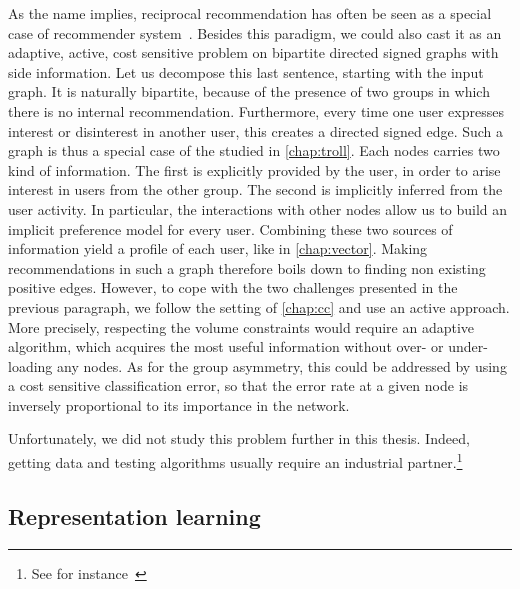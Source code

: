 As the name implies, reciprocal recommendation has often be seen as a special case of recommender
system~\autocite{Andrews2015}. Besides this paradigm, we could also cast it as an adaptive, active,
cost sensitive \esp{} problem on bipartite directed signed graphs with side information. Let us
decompose this last sentence, starting with the input graph. It is naturally bipartite, because of
the presence of two groups in which there is no internal recommendation. Furthermore, every time one
user expresses interest or disinterest in another user, this creates a directed signed edge. Such a
graph is thus a special case of the \dssn{} studied in \autoref{chap:troll}. Each nodes carries two
kind of information. The first is explicitly provided by the user, in order to arise interest in
users from the other group. The second is implicitly inferred from the user activity. In particular,
the interactions with other nodes allow us to build an implicit preference model for every user.
Combining these two sources of information yield a profile of each user, like in
\autoref{chap:vector}. Making recommendations in such a graph therefore boils down to finding non
existing positive edges. However, to cope with the two challenges presented in the previous
paragraph, we follow the setting of \autoref{chap:cc} and use an active approach. More precisely,
respecting the volume constraints would require an adaptive algorithm, which acquires the most
useful information without over- or under-loading any nodes. As for the group asymmetry, this could
be addressed by using a cost sensitive classification error, so that the error rate at a given node
is inversely proportional to its importance in the network.

Unfortunately, we did not study this problem further in this thesis. Indeed, getting data and
testing algorithms usually require an industrial partner.\footnote{See for
instance~\autocites{Andrews2015}{Kille2015}{Krzywicki2015}{Xia2015}{Alanazi}}

\subsection{Representation learning}
\label{par:representation_learning}

